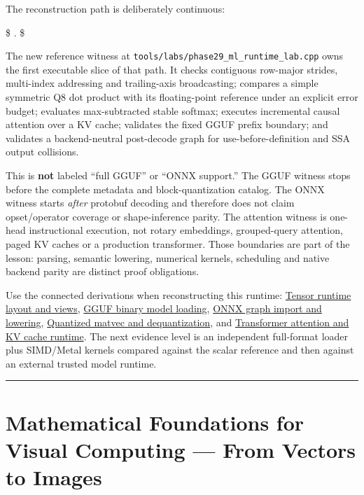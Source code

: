 The reconstruction path is deliberately continuous:

\$  \rightarrow {} \rightarrow {} \rightarrow {} \rightarrow {} \rightarrow {} \rightarrow {}. \$

The new reference witness at \texttt{tools/labs/phase29\_ml\_runtime\_lab.cpp} owns the first executable slice of that path. It checks contiguous row-major strides, multi-index addressing and trailing-axis broadcasting; compares a simple symmetric Q8 dot product with its floating-point reference under an explicit error budget; evaluates max-subtracted stable softmax; executes incremental causal attention over a KV cache; validates the fixed GGUF prefix boundary; and validates a backend-neutral post-decode graph for use-before-definition and SSA output collisions.

This is \textbf{not} labeled ``full GGUF'' or ``ONNX support.'' The GGUF witness stops before the complete metadata and block-quantization catalog. The ONNX witness starts \emph{after} protobuf decoding and therefore does not claim opset/operator coverage or shape-inference parity. The attention witness is one-head instructional execution, not rotary embeddings, grouped-query attention, paged KV caches or a production transformer. Those boundaries are part of the lesson: parsing, semantic lowering, numerical kernels, scheduling and native backend parity are distinct proof obligations.

Use the connected derivations when reconstructing this runtime: \hyperref[appendix-cebadf3106d1]{Tensor runtime layout and views}, \hyperref[appendix-fef72dd246f2]{GGUF binary model loading}, \hyperref[appendix-a87217e3af2b]{ONNX graph import and lowering}, \hyperref[appendix-241c0e42ac2d]{Quantized matvec and dequantization}, and \hyperref[appendix-ea2dadd21ce5]{Transformer attention and KV cache runtime}. The next evidence level is an independent full-format loader plus SIMD/Metal kernels compared against the scalar reference and then against an external trusted model runtime.

\begin{center}\rule{0.5\linewidth}{0.5pt}\end{center}

\section{Mathematical Foundations for Visual Computing --- From Vectors to Images}\label{01-foundations-i-ch017-mathematical-foundations-for-visual-computing-from-vectors-to-images}

